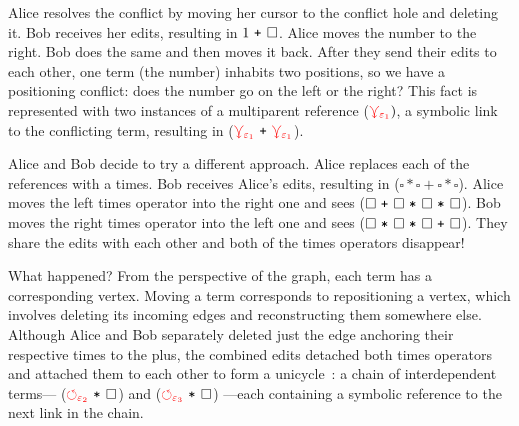 \documentclass[nonacm, acmsmall, screen, review]{acmart}
\newcommand{\e}{\varepsilon}
\newcommand{\id}[1]{\textcolor{gray}{\ensuremath{#1}}}
\newcommand{\eid}[2]{{#2}^{\id{#1}}}
\newcommand{\ePlus}[3]{#2~\eid{#1}{\texttt{+}}~#3}
\newcommand{\eTimes}[3]{#2~\eid{#1}{\texttt{*}}~#3}
\newcommand{\hole}{\ensuremath{\square}} %
\newcommand{\multiVertex}[1]{\textcolor{red}{\ensuremath{\curlyveedownarrow_{#1}}}}
\newcommand{\cycleVertex}[1]{\textcolor{red}{\ensuremath{\circlearrowleft_{#1}}}}
\begin{document}

Alice resolves the conflict by moving her cursor to the conflict hole and deleting it.
Bob receives her edits, resulting in $\ePlus{}{1}{\hole}$.
Alice moves the number to the right.
Bob does the same and then moves it back.
After they send their edits to each other, one term (the number) inhabits two positions, so we have a positioning conflict:
does the number go on the left or the right?
This fact is represented with two instances of a multiparent reference ($\multiVertex{\e_1})$,
a symbolic link to the conflicting term,
resulting in ($\ePlus{}{\multiVertex{\e_1}}{\multiVertex{\e_1}}$).

Alice and Bob decide to try a different approach.
Alice replaces each of the references with a times.
Bob receives Alice's edits, resulting in ($\hole * \hole + \hole * \hole$).
Alice moves the left times operator into the right one and sees ($\ePlus{}{\hole}{\eTimes{}{\eTimes{}{\hole}{\hole}}{\hole}}$).
Bob moves the right times operator into the left one and sees ($\ePlus{}{\eTimes{}{\hole}{\eTimes{}{\hole}{\hole}}}{\hole}$).
They share the edits with each other and both of the times operators disappear!

What happened?
From the perspective of the graph, each term has a corresponding vertex.
Moving a term corresponds to repositioning a vertex,
which involves deleting its incoming edges and reconstructing them somewhere else.
Although Alice and Bob separately deleted just the edge anchoring their respective times to the plus,
the combined edits detached both times operators and attached them to each other to
form a unicycle~\cite{kruskal_efficient_1990}:
a chain of interdependent terms---%
($\eTimes{}{\cycleVertex{\e_2}}{\hole}$) and ($\eTimes{}{\cycleVertex{\e_3}}{\hole}$)%
---each containing a symbolic reference to the next link in the chain.
\end{document}
